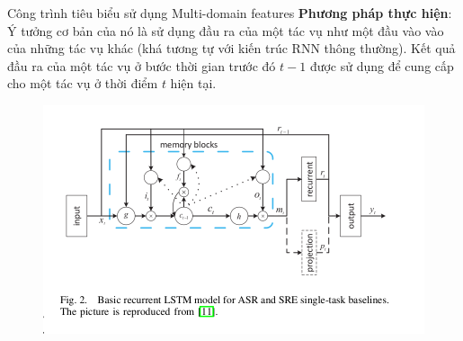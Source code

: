 \documentclass[notheorems, aspectratio=54]{beamer}
\begin{document}
\begin{frame}{Công trình tiêu biểu sử dụng Multi-domain features}
	\textbf{Phương pháp thực hiện}: Ý tưởng cơ bản của nó là sử dụng đầu ra của một tác vụ như một đầu vào vào của những tác vụ khác (khá tương tự với kiến trúc RNN thông thường). Kết quả đầu ra của một tác vụ ở bước thời gian trước đó $t-1$ được sử dụng để cung cấp cho một tác vụ ở thời điểm $t$ hiện tại.
	\begin{figure}[H]
		\centering
		\includegraphics[width=0.75\linewidth]{images/basis-single-task-model.png}
		\label{fig:writing-thesis}
	\end{figure}
\end{frame}
\end{document}
